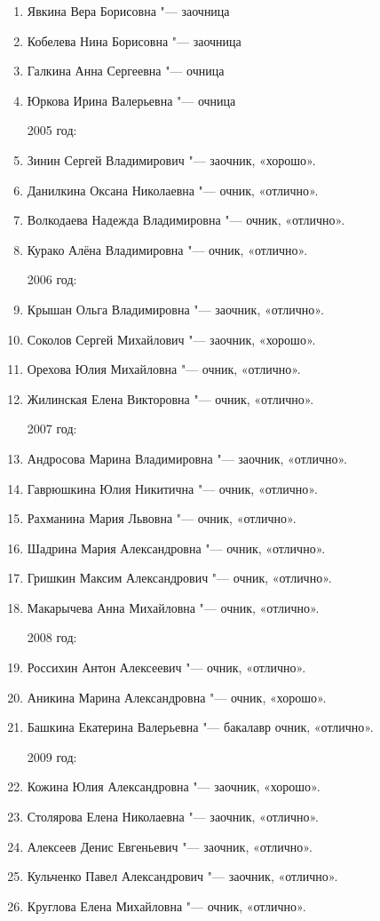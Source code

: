 \begin{enumerate}[nosep]
{2004 год:}
	\item Явкина Вера Борисовна "--- заочница
	\item Кобелева Нина Борисовна "--- заочница
	\item Галкина Анна Сергеевна "--- очница
	\item Юркова Ирина Валерьевна "--- очница

{2005 год:}
	\item Зинин Сергей Владимирович "--- заочник, «хорошо».
	\item Данилкина Оксана Николаевна "--- очник, «отлично».
	\item Волкодаева Надежда Владимировна "--- очник, «отлично».
	\item Курако Алёна Владимировна "--- очник, «отлично».
	
{2006 год:}
	\item Крышан Ольга Владимировна "--- заочник, «отлично».
	\item Соколов Сергей Михайлович "--- заочник, «хорошо».
	\item Орехова Юлия Михайловна "--- очник, «отлично».
	\item Жилинская Елена Викторовна "--- очник, «отлично».

\pagebreak	

{2007 год:}
	\item Андросова Марина Владимировна "--- заочник, «отлично».
	\item Гаврюшкина Юлия Никитична "--- очник, «отлично».
	\item Рахманина Мария Львовна "--- очник, «отлично».
	\item Шадрина Мария Александровна "--- очник, «отлично».
	\item Гришкин Максим Александрович "--- очник, «отлично». 
	\item Макарычева Анна Михайловна "--- очник, «отлично».
	
{2008 год:}
	\item Россихин Антон Алексеевич "--- очник, «отлично».
	\item Аникина Марина Александровна "--- очник, «хорошо».
	\item Башкина Екатерина Валерьевна "--- бакалавр очник, «отлично».
	
{2009 год:}
	\item Кожина Юлия Александровна "--- заочник, «хорошо».
	\item Столярова Елена Николаевна "--- заочник, «отлично».
	\item Алексеев Денис Евгеньевич "--- заочник, «отлично».
	\item Кульченко Павел Александрович "--- заочник, «отлично».
	\item Круглова Елена Михайловна "--- очник, «отлично».
	

\end{enumerate}
